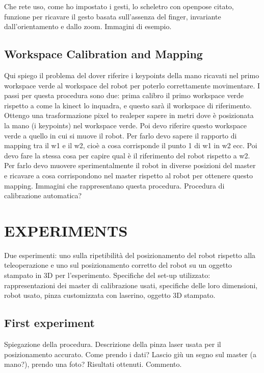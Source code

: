 \documentclass[letterpaper, 10 pt, conference]{ieeeconf}  %
\begin{document}
Che rete uso, come ho impostato i gesti, lo scheletro con openpose citato, funzione per ricavare il gesto basata sull'assenza del finger, invariante dall'orientamento e dallo zoom. Immagini di esempio.

\subsection{Workspace Calibration and Mapping}

Qui spiego il problema del dover riferire i keypoints della mano ricavati nel primo workspace verde al workspace del robot per poterlo correttamente movimentare. I passi per questa procedura sono due: prima calibro il primo workspace verde rispetto a come la kinect lo inquadra, e questo sarà il workspace di riferimento. Ottengo una trasformazione pixel to realeper sapere in metri dove è posizionata la mano (i keypoints) nel workspace verde.
Poi devo riferire questo workspace verde a quello in cui si muove il robot. Per farlo devo sapere il rapporto di mapping tra il w1 e il w2, cioè a cosa corrisponde il punto 1 di w1 in w2 ecc. Poi devo fare la stessa cosa per capire qual è il riferimento del robot rispetto a w2. Per farlo devo muovere sperimentalmente il robot in diverse posizioni del master e ricavare a cosa corrispondono nel master rispetto al robot per ottenere questo mapping.
Immagini che rappresentano questa procedura.
Procedura di calibrazione automatica?

\section{EXPERIMENTS}

Due esperimenti: uno sulla ripetibilità del posizionamento del robot rispetto alla teleoperazione e uno sul posizionamento corretto del robot su un oggetto stampato in 3D per l'esperimento.
Specifiche del set-up utilizzato: rappresentazioni dei master di calibrazione usati, specifiche delle loro dimensioni, robot usato, pinza customizzata con laserino, oggetto 3D stampato.

\subsection{First experiment}

Spiegazione della procedura. Descrizione della pinza laser usata per il posizionamento accurato. Come prendo i dati? Lascio giù un segno sul master (a mano?), prendo una foto?
Risultati ottenuti.
Commento.
\end{document}
